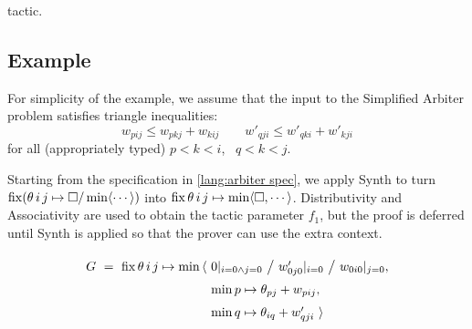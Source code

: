 \Obligations tactic.


\subsection{Example \hrulefill}

For simplicity of the example, we assume that the input to the Simplified Arbiter problem
satisfies triangle inequalities:
%
\begin{equation}
w_{pij} \leq w_{pkj} + w_{kij} \qquad w'_{qji} \leq w'_{qki} + w'_{kji}
\label{equ:triangle}
\end{equation}
%
for all (appropriately typed) $p<k<i$, ~$q<k<j$.

\medskip
Starting from the specification in \eqref{lang:arbiter spec}, we apply Synth to turn
$\operatorname{fix} (\theta\,i\,j\mapsto\square/\min\langle\cdots\rangle)$ into $\operatorname{fix}\theta\,i\,j\mapsto\min\langle\square,\cdots\rangle$.
Distributivity and Associativity are used to obtain the tactic parameter $f_1$, 
but the proof is deferred until Synth is applied so that the prover can use the extra context.

\begin{center}
\end{center}

\begin{equation}
  \renewcommand\arraystretch{1.5}
  \begin{array}{@{}l@{}l@{}l@{}}
    G ~=~ \fix \theta\,i\,j\mapsto{}
	      & \min\,\langle~ & 0|_{i=0\land j=0} ~\big/~ w'_{0j0}|_{i=0} ~\big/~ w_{0i0}|_{j=0}, \\
	      & & \min p\mapsto\theta_{pj}+w_{pij}, \\
	      & & \min q\mapsto\theta_{iq}+w'_{qji} ~\rangle
  \end{array}
\end{equation}

